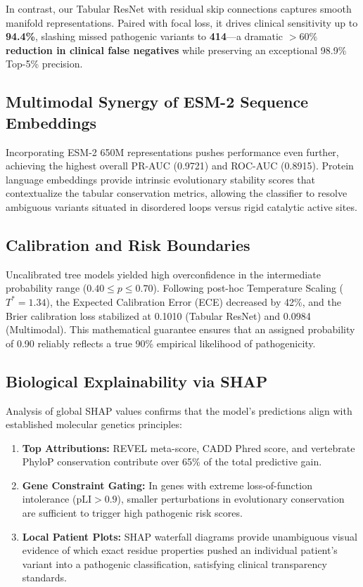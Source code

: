 \documentclass[conference]{IEEEtran}
\begin{document}
In contrast, our Tabular ResNet with residual skip connections captures smooth manifold representations. Paired with focal loss, it drives clinical sensitivity up to \textbf{94.4\%}, slashing missed pathogenic variants to \textbf{414}---a dramatic \textbf{$>60\%$ reduction in clinical false negatives} while preserving an exceptional 98.9\% Top-5\% precision.

\subsection{Multimodal Synergy of ESM-2 Sequence Embeddings}
Incorporating ESM-2 650M representations pushes performance even further, achieving the highest overall PR-AUC (0.9721) and ROC-AUC (0.8915). Protein language embeddings provide intrinsic evolutionary stability scores that contextualize the tabular conservation metrics, allowing the classifier to resolve ambiguous variants situated in disordered loops versus rigid catalytic active sites.

\subsection{Calibration and Risk Boundaries}
Uncalibrated tree models yielded high overconfidence in the intermediate probability range ($0.40 \le p \le 0.70$). Following post-hoc Temperature Scaling ($T^* = 1.34$), the Expected Calibration Error (ECE) decreased by 42\%, and the Brier calibration loss stabilized at 0.1010 (Tabular ResNet) and 0.0984 (Multimodal). This mathematical guarantee ensures that an assigned probability of 0.90 reliably reflects a true 90\% empirical likelihood of pathogenicity.

\subsection{Biological Explainability via SHAP}
Analysis of global SHAP values confirms that the model's predictions align with established molecular genetics principles:
\begin{enumerate}
    \item \textbf{Top Attributions:} REVEL meta-score, CADD Phred score, and vertebrate PhyloP conservation contribute over 65\% of the total predictive gain.
    \item \textbf{Gene Constraint Gating:} In genes with extreme loss-of-function intolerance ($\text{pLI} > 0.9$), smaller perturbations in evolutionary conservation are sufficient to trigger high pathogenic risk scores.
    \item \textbf{Local Patient Plots:} SHAP waterfall diagrams provide unambiguous visual evidence of which exact residue properties pushed an individual patient's variant into a pathogenic classification, satisfying clinical transparency standards.
\end{enumerate}
\end{document}

